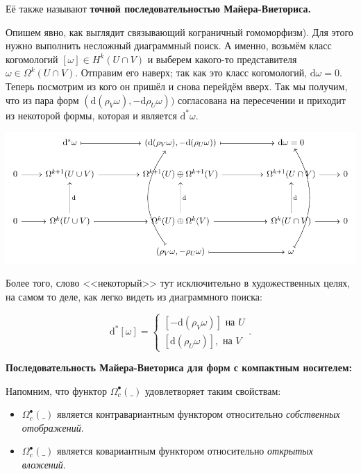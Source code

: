  	  Её также называют \bf{точной последовательностью Майера-Виеториса}. 

 	  Опишем явно, как выглядит связывающий кограничный гомоморфизм). Для этого нужно выполнить несложный диаграммный поиск. А именно, возьмём класс когомологий $[\omega] \in H^k(U \cap V)$ и выберем какого-то представителя $\omega \in \Omega^k(U \cap V)$. Отправим его наверх; так как это класс когомологий, $\mathrm{d}\omega = 0$. Теперь посмотрим из кого он пришёл и снова перейдём вверх. Так мы получим, что из пара форм $(\mathrm{d}(\rho_V \omega), - \mathrm{d}\rho_U \omega))$ согласована на пересечении и приходит из некоторой формы, которая и является $\mathrm{d}^*\omega$. 

 	  \begin{center}
 	  	\includegraphics{lectures/7/pictures/cd_7.pdf}
 	  \end{center}

 	  Более того, слово <<некоторый>> тут исключительно в художественных целях, на самом то деле, как легко видеть из диаграммного поиска: 

 	  \[
 	  	\mathrm{d}^*[\omega] = \begin{cases} [-\mathrm{d}(\rho_V \omega)] \text{ на } U \\ [\mathrm{d}(\rho_U \omega)], \text{ на } V \end{cases}. 
 	  \]

	\noindent\bf{Последовательность Майера-Виеториса для форм с компактным носителем:}

	Напомним, что функтор $\Omega^{\bullet}_{c}(\_)$ удовлетворяет таким свойствам: 

	\begin{itemize}
		\item $\Omega^{\bullet}_{c}(\_)$ является контравариантным функтором относительно \emph{собственных отображений}. 

		\item $\Omega^{\bullet}_{c}(\_)$ является ковариантным функтором относительно \emph{открытых вложений}. 
	\end{itemize}


